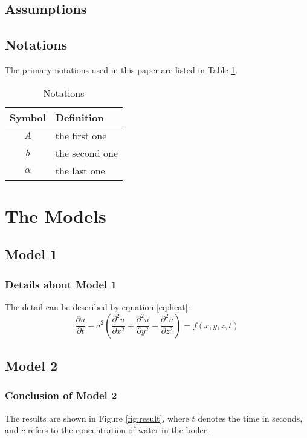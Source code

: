 \documentclass[12pt]{article}  %
\begin{document}
\subsection{Assumptions}

\subsection{Notations}
The primary notations used in this paper are listed in Table \ref{tb:notation}.

\begin{table}[!htbp]
\begin{center}
\caption{Notations}
\begin{tabular}{cl}
	\toprule
	\multicolumn{1}{m{3cm}}{\centering Symbol}
	&\multicolumn{1}{m{8cm}}{\centering Definition}\\
	\midrule
	$A$&the first one\\
	$b$&the second one\\
	$\alpha$ &the last one\\
	\bottomrule
\end{tabular}\label{tb:notation}
\end{center}
\end{table}

\section{The Models}
\subsection{Model 1}
\subsubsection{Details about Model 1}
The detail can be described by equation \eqref{eq:heat}:
\begin{equation}\label{eq:heat}
\frac{\partial u}{\partial t} - a^2 \left( \frac{\partial^2 u}{\partial x^2} + \frac{\partial^2 u}{\partial y^2} + \frac{\partial^2 u}{\partial z^2} \right) = f(x, y, z, t)
\end{equation}

\subsection{Model 2}
\subsubsection{Conclusion of Model 2}
The results are shown in Figure \ref{fig:result}, where $t$ denotes the time in seconds, and $c$ refers to the concentration of water in the boiler.
\end{document}
